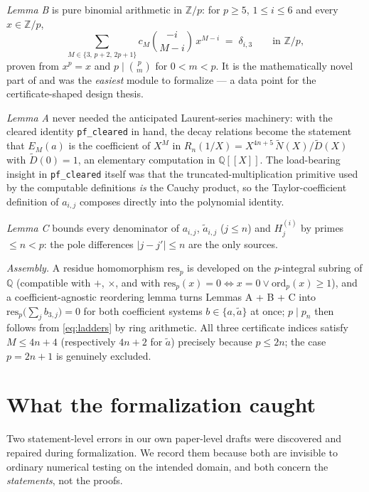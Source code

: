\documentclass[11pt]{article}
\theoremstyle{definition}
\newcommand{\Z}{\mathbb{Z}}
\newcommand{\Q}{\mathbb{Q}}
\newcommand{\bin}[2]{\binom{#1}{#2}}
\newcommand{\wtd}{\widetilde}
\newcommand{\lean}[1]{\texttt{#1}}
\begin{document}
\emph{Lemma B} is pure binomial arithmetic in $\Z/p$: for $p \ge 5$,
$1 \le i \le 6$ and every $x \in \Z/p$,
\[
\sum_{M \in \{3,\, p+2,\, 2p+1\}} c_M \bin{-i}{M-i}\, x^{M-i}
\;=\; \delta_{i,3} \qquad\text{in } \Z/p,
\]
proven from $x^p = x$ and $p \mid \bin{p}{m}$ for $0 < m < p$. It is the
mathematically novel part of \cite{CBcert} and was the \emph{easiest} module
to formalize --- a data point for the certificate-shaped design thesis.

\emph{Lemma A} never needed the anticipated Laurent-series machinery: with
the cleared identity \lean{pf\_cleared} in hand, the decay relations become
the statement that $E_M(a)$ is the coefficient of $X^M$ in
$R_n(1/X) = X^{4n+5}\,\wtd N(X)/\wtd D(X)$ with $\wtd D(0) = 1$, an
elementary computation in $\Q[[X]]$. The load-bearing insight in
\lean{pf\_cleared} itself was that the truncated-multiplication primitive
used by the computable definitions \emph{is} the Cauchy product, so the
Taylor-coefficient definition of $a_{i,j}$ composes directly into the
polynomial identity.

\emph{Lemma C} bounds every denominator of $a_{i,j}$, $\wtd a_{i,j}$
($j \le n$) and $H_j^{(i)}$ by primes $\le n < p$: the pole differences
$|j - j'| \le n$ are the only sources.

\emph{Assembly.} A residue homomorphism $\mathrm{res}_p$ is developed on the
$p$-integral subring of $\Q$ (compatible with $+$, $\times$, and with
$\mathrm{res}_p(x) = 0 \iff x = 0 \vee \mathrm{ord}_p(x) \ge 1$), and a
coefficient-agnostic reordering lemma turns Lemmas A + B + C into
$\mathrm{res}_p\bigl(\sum_j b_{3,j}\bigr) = 0$ for both coefficient systems
$b \in \{a, \wtd a\}$ at once; $p \mid p_n$ then follows from
\eqref{eq:ladders} by ring arithmetic. All three certificate indices satisfy
$M \le 4n+4$ (respectively $4n+2$ for $\wtd a$) precisely because
$p \le 2n$; the case $p = 2n+1$ is genuinely excluded.

\section{What the formalization caught}\label{sec:caught}

Two statement-level errors in our own paper-level drafts were discovered and
repaired during formalization. We record them because both are invisible to
ordinary numerical testing on the intended domain, and both concern the
\emph{statements}, not the proofs.
\end{document}

